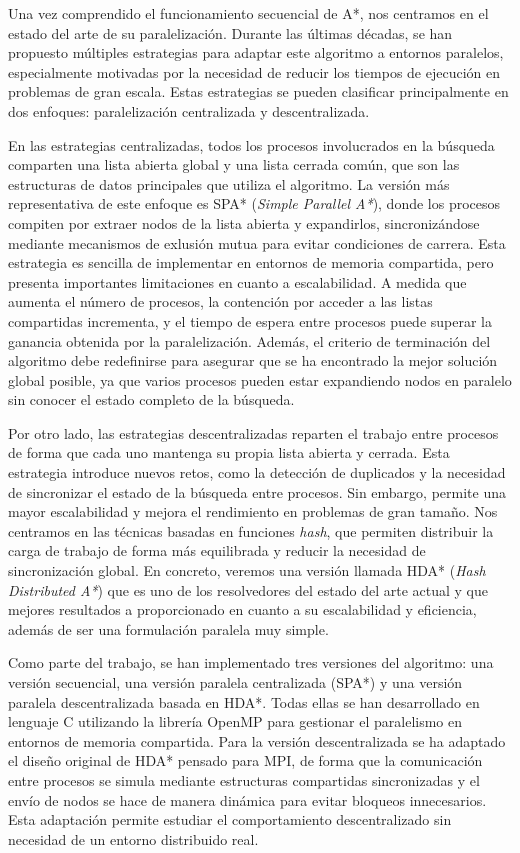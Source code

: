 \documentclass[a4paper,12pt]{article}
\begin{document}
Una vez comprendido el funcionamiento secuencial de A*, nos centramos en el estado del arte de su paralelización. Durante las últimas décadas, se han propuesto múltiples estrategias para adaptar este algoritmo a entornos paralelos, especialmente motivadas por la necesidad de reducir los tiempos de ejecución en problemas de gran escala. Estas estrategias se pueden clasificar principalmente en dos enfoques: paralelización centralizada y descentralizada.

En las estrategias centralizadas, todos los procesos involucrados en la búsqueda comparten una lista abierta global y una lista cerrada común, que son las estructuras de datos principales que utiliza el algoritmo. La versión más representativa de este enfoque es SPA* (\textit{Simple Parallel A*}), donde los procesos compiten por extraer nodos de la lista abierta y expandirlos, sincronizándose mediante mecanismos de exlusión mutua para evitar condiciones de carrera. Esta estrategia es sencilla de implementar en entornos de memoria compartida, pero presenta importantes limitaciones en cuanto a escalabilidad. A medida que aumenta el número de procesos, la contención por acceder a las listas compartidas incrementa, y el tiempo de espera entre procesos puede superar la ganancia obtenida por la paralelización. Además, el criterio de terminación del algoritmo debe redefinirse para asegurar que se ha encontrado la mejor solución global posible, ya que varios procesos pueden estar expandiendo nodos en paralelo sin conocer el estado completo de la búsqueda.

Por otro lado, las estrategias descentralizadas reparten el trabajo entre procesos de forma que cada uno mantenga su propia lista abierta y cerrada. Esta estrategia introduce nuevos retos, como la detección de duplicados y la necesidad de sincronizar el estado de la búsqueda entre procesos. Sin embargo, permite una mayor escalabilidad y mejora el rendimiento en problemas de gran tamaño. Nos centramos en las técnicas basadas en funciones \textit{hash}, que permiten distribuir la carga de trabajo de forma más equilibrada y reducir la necesidad de sincronización global. En concreto, veremos una versión llamada HDA* (\textit{Hash Distributed A*}) que es uno de los resolvedores del estado del arte actual y que mejores resultados a proporcionado en cuanto a su escalabilidad y eficiencia, además de ser una formulación paralela muy simple.

Como parte del trabajo, se han implementado tres versiones del algoritmo: una versión secuencial, una versión paralela centralizada (SPA*) y una versión paralela descentralizada basada en HDA*. Todas ellas se han desarrollado en lenguaje C utilizando la librería OpenMP para gestionar el paralelismo en entornos de memoria compartida. Para la versión descentralizada se ha adaptado el diseño original de HDA* pensado para MPI, de forma que la comunicación entre procesos se simula mediante estructuras compartidas sincronizadas y el envío de nodos se hace de manera dinámica para evitar bloqueos innecesarios. Esta adaptación permite estudiar el comportamiento descentralizado sin necesidad de un entorno distribuido real.
\end{document}
